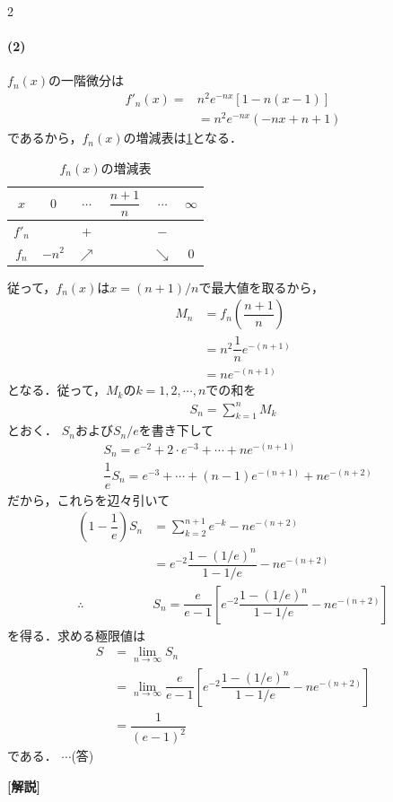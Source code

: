 \documentclass[../../main.tex]{subfiles}
\begin{document}
\begin{multicols}{2}
  \paragraph{(2)}
  $f_n(x)$の一階微分は
  \begin{align}
    f'_n(x) =
    & n^2e^{-nx}\left[1-n(x-1)\right] \\
    & = n^2e^{-nx}(-nx+n+1)
  \end{align}
  であるから，$f_n(x)$の増減表は\cref{2000-2:table:1}となる．
  \begin{table}[H]
    \centering
    \caption{$f_n(x)$の増減表}
    \label{2000-2:table:1}
    \begin{tabular}{|c||c|c|c|c|c|}
      \hline
      $x$    & $0$    & $\cdots$   & $\dfrac{n+1}{n}$ & $\cdots$   & $\infty$ \\
      \hline
      $f'_n$ &        & $+$        &                 & $-$        &          \\
      \hline
      $f_n$  & $-n^2$ & $\nearrow$ &                 & $\searrow$ & $0$      \\
      \hline
    \end{tabular}
  \end{table}
  従って，$f_n(x)$は$x=(n+1)/n$で最大値を取るから，
  \begin{align}
    M_n
    & = f_n\left(\dfrac{n+1}{n}\right) \\
    & = n^2 \dfrac{1}{n} e^{-(n+1)}    \\
    & = n e^{-(n+1)}
  \end{align}
  となる．従って，$M_k$の$k=1,2,\cdots,n$での和を
  \begin{align}
    S_n= \sum_{k=1}^{n}M_k
  \end{align}
  とおく．
  $S_n$および$S_n/e$を書き下して
  \begin{align}
    & S_n = e^{-2} + 2 \cdot e^{-3} + \cdots + n e^{-(n+1)}              \\
    & \dfrac{1}{e}S_n = e^{-3} + \cdots + (n-1) e^{-(n+1)} + n e^{-(n+2)}
  \end{align}
  だから，これらを辺々引いて
  \begin{align}
    \left(1-\dfrac{1}{e}\right)S_n
    & = \sum_{k=2}^{n+1} e^{-k} - n e^{-(n+2)}                                     \\
    & = e^{-2} \dfrac{1-(1/e)^n}{1-1/e} - n e^{-(n+2)}                                  \\
    \therefore
    & S_n = \dfrac{e}{e-1} \left[ e^{-2} \dfrac{1-(1/e)^n}{1-1/e} - n e^{-(n+2)} \right]
  \end{align}
  を得る．求める極限値は
  \begin{align}
    S
    & = \lim_{n\to\infty}S_n                                                                        \\
    & = \lim_{n\to\infty}\dfrac{e}{e-1} \left[ e^{-2} \dfrac{1-(1/e)^n}{1-1/e} - n e^{-(n+2)} \right] \\
    & =\dfrac{1}{(e-1)^2}
  \end{align}
  である．  $\cdots$(答)

  {\bf [解説]}

  \newpage
\end{multicols}
\end{document}
